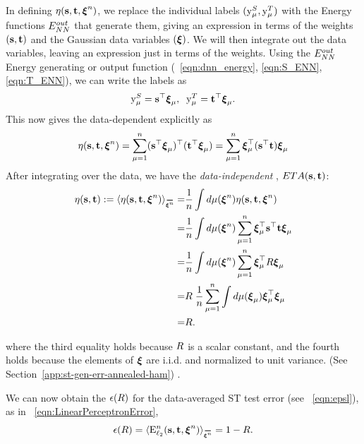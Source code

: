In defining $\eta({\mathbf{s}},{\mathbf{t}},\boldsymbol{\xi}^{n})$, we replace the individual labels $(\mathrm{y}_{\mu}^{S},\mathrm{y}_{\mu}^{T})$ with the Energy functions $E^{out}_{NN}$ that generate them, giving an expression in terms of the weights $({\mathbf{s}},{\mathbf{t}})$ and the Gaussian data variables $(\boldsymbol{\xi})$. We will then integrate out the data variables, leaving an expression just in terms of the weights.  
Using the $E^{out}_{NN}$ Energy generating or output function (\EQN~\ref{eqn:dnn_energy}, \ref{eqn:S_ENN}, \ref{eqn:T_ENN}), we can write the labels as
\begin{align}
\mathrm{y}_{\mu}^{S}={\mathbf{s}}^{\top}\boldsymbol{\xi}_{\mu},\;\;
\mathrm{y}_{\mu}^{T}={\mathbf{t}}^{\top}\boldsymbol{\xi}_{\mu}  .
\end{align}
This now gives the data-dependent \SelfOverlap explicitly as
\begin{align}
  \label{eqn:eta_vec_xi_def}
\eta({\mathbf{s}},{\mathbf{t}},\boldsymbol{\xi}^{n}) =\sum_{\mu=1}^{n} ({\mathbf{s}}^{\top}\boldsymbol{\xi}_{\mu})^{\top} ({\mathbf{t}}^{\top}\boldsymbol{\xi}_{\mu}) = \sum_{\mu=1}^{n}\boldsymbol{\xi}^{\top}_{\mu}  ({\mathbf{s}}^{\top} {\mathbf{t}} )\boldsymbol{\xi}_{\mu} 
\end{align}
After integrating over the data, we have the \emph{data-independent \SelfOverlap}, $ETA({\mathbf{s}},{\mathbf{t}})$:
\begin{align}
\label{eqn:eta_vec_avg_def}
\ETA(\SVEC,\TVEC) := \langle\ETA(\SVEC,\TVEC,\NDXI)\rangle_{\AVGNDXI}
   = & \frac{1}{\ND}\int d\mu(\NDXI)\ETA(\SVEC,\TVEC,\NDXI) \\ \nonumber
= & \frac{1}{\ND}\int d\mu(\NDXI)\sum_{\mu=1}^{\ND}\XI_{\mu}^{\top}\SVEC^{\top}\TVEC\XI_{\mu} \\ \nonumber
= & \frac{1}{\ND}\int d\mu(\NDXI)\sum_{\mu=1}^{\ND}\XI_{\mu}^{\top}\AVGR\XI_{\mu} \\ \nonumber
= & \AVGR\;\frac{1}{\ND}\sum_{\mu=1}^{\ND}\int d\mu(\XI_{\mu})\XI_{\mu}^{\top}\XI_{\mu} \\ \nonumber
   = &\AVGR.
\end{align}

where the third equality holds because $R$ is a scalar constant, and the fourth holds because the elements of $\boldsymbol{\xi}$ are i.i.d. and normalized to unit variance.
(See Section~\ref{app:st-gen-err-annealed-ham}) .

We can now obtain the \EffectivePotential $\epsilon(R)$ for the data-averaged ST test error (see \EQN~\ref{eqn:epsl}),  as in \EQN~\ref{eqn:LinearPerceptronError},
\begin{align}
\label{eqn:e0}
\EPSL(\AVGR)=\langle\DETOPSTLL\rangle_{\AVGNDXI} =  1 - \AVGR .
\end{align}

